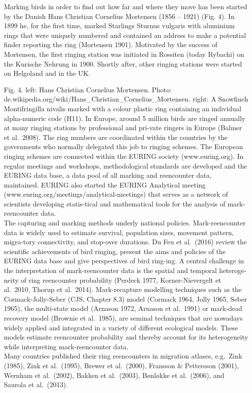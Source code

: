 \documentclass[
]{book}
\begin{document}
Marking birds in order to find out how far and where they move has been started by the Danish Hans Christian Cornelius Mortensen (1856 -- 1921) (Fig. 4). In 1899 he, for the first time, marked Starlings Sturnus vulgaris with aluminium rings that were uniquely numbered and contained an address to make a potential finder reporting the ring (Mortensen 1901). Motivated by the success of Mortensen, the first ringing station was initiated in Rossiten (today Rybachi) on the Kurische Nehrung in 1900. Shortly after, other ringing stations were started on Helgoland and in the UK.

Fig. 4. left: Hans Christian Cornelius Mortensen. Photo: de.wikipedia.org/wiki/Hans\_Christian\_Cornelius\_Mortensen. right: A Snowfinch Montifringilla nivalis marked with a colour plastic ring containing an individual alpha-numeric code (H11).
In Europe, around 5 million birds are ringed annually at many ringing stations by professional and pri-vate ringers in Europe (Balmer et al.~2008). The ring numbers are coordinated within the countries by the governments who normally delegated this job to ringing schemes. The European ringing schemes are connected within the EURING society (www.euring.org). In regular meetings and workshops, methodological standards are developed and the EURING data base, a data pool of all marking and reencounter data, maintained. EURING also started the EURING Analytical meeting (www.euring.org/meetings/analytical-meetings) that serves as a network of scientists developing statis-tical and mathematical tools for the analysis of mark-reencounter data.\\
The capturing and marking methods underly national policies.
Mark-reencounter data is widely used to estimate survival, population sizes, movement pattern, migra-tory connectivity, and stop-over durations. Du Feu et al.~(2016) review the scientific achievements of bird ringing, present the aims and policies of the EURING data base and give perspectives of bird ring-ing.
A central challenge in the interpretation of mark-reencounter data is the spatial and temporal heteroge-neity of ring reencounter probability (Perdeck 1977, Korner-Nievergelt et al.~2010, Thorup et al.~2014). Mark-recapture modelling techniques such as the Cormack-Jolly-Seber (CJS, Chapter 8.3) model (Cormack 1964, Jolly 1965, Seber 1965), the multi-state model (Arnason 1972, Arnason et al.~1991) or mark-dead recovery model (Brownie et al.~1985), are seminal techniques that are nowadays widely applied and integrated in a variety of different ecological models. These models estimate reencounter probability and thereby account for its heterogeneity while interpreting mark-reencounter data.\\
Many countries published their ring reencounters in migration atlases, e.g.~Zink (1985), Zink et al.~(1995), Brewer et al.~(2000), Fransson \& Pettersson (2001), Wernham et al.~(2002), Bakken et al.~(2003), Bønløkke et al.~(2006), and Saurola et al.~(2013).
\end{document}
